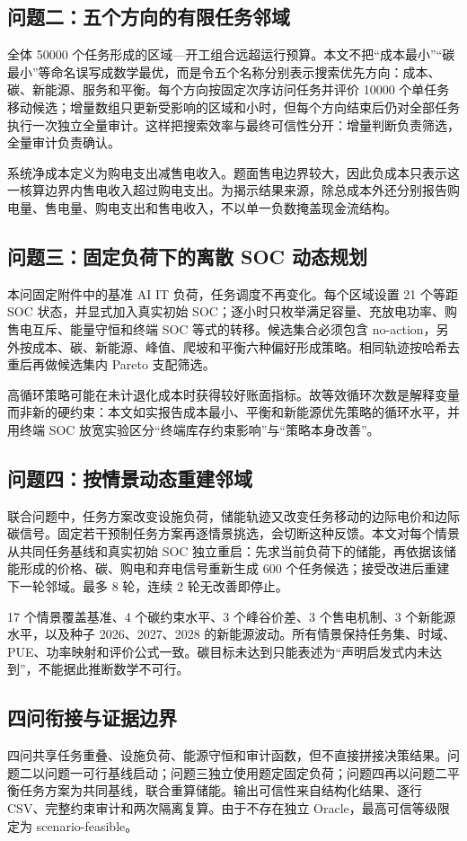 \documentclass[withoutpreface,bwprint]{cumcmthesis}
\begin{document}
\subsection{问题二：五个方向的有限任务邻域}
全体 50000 个任务形成的区域—开工组合远超运行预算。本文不把“成本最小”“碳最小”等命名误写成数学最优，而是令五个名称分别表示搜索优先方向：成本、碳、新能源、服务和平衡。每个方向按固定次序访问任务并评价 10000 个单任务移动候选；增量数组只更新受影响的区域和小时，但每个方向结束后仍对全部任务执行一次独立全量审计。这样把搜索效率与最终可信性分开：增量判断负责筛选，全量审计负责确认。

系统净成本定义为购电支出减售电收入。题面售电边界较大，因此负成本只表示这一核算边界内售电收入超过购电支出。为揭示结果来源，除总成本外还分别报告购电量、售电量、购电支出和售电收入，不以单一负数掩盖现金流结构。

\subsection{问题三：固定负荷下的离散 SOC 动态规划}
本问固定附件中的基准 AI IT 负荷，任务调度不再变化。每个区域设置 21 个等距 SOC 状态，并显式加入真实初始 SOC；逐小时只枚举满足容量、充放电功率、购售电互斥、能量守恒和终端 SOC 等式的转移。候选集合必须包含 no-action，另外按成本、碳、新能源、峰值、爬坡和平衡六种偏好形成策略。相同轨迹按哈希去重后再做候选集内 Pareto 支配筛选\cite{miettinen1999nonlinear}。

高循环策略可能在未计退化成本时获得较好账面指标。故等效循环次数是解释变量而非新的硬约束：本文如实报告成本最小、平衡和新能源优先策略的循环水平，并用终端 SOC 放宽实验区分“终端库存约束影响”与“策略本身改善”。

\subsection{问题四：按情景动态重建邻域}
联合问题中，任务方案改变设施负荷，储能轨迹又改变任务移动的边际电价和边际碳信号。固定若干预制任务方案再逐情景挑选，会切断这种反馈。本文对每个情景从共同任务基线和真实初始 SOC 独立重启：先求当前负荷下的储能，再依据该储能形成的价格、碳、购电和弃电信号重新生成 600 个任务候选；接受改进后重建下一轮邻域。最多 8 轮，连续 2 轮无改善即停止。

17 个情景覆盖基准、4 个碳约束水平、3 个峰谷价差、3 个售电机制、3 个新能源水平，以及种子 2026、2027、2028 的新能源波动。所有情景保持任务集、时域、PUE、功率映射和评价公式一致。碳目标未达到只能表述为“声明启发式内未达到”，不能据此推断数学不可行。

\subsection{四问衔接与证据边界}
四问共享任务重叠、设施负荷、能源守恒和审计函数，但不直接拼接决策结果。问题二以问题一可行基线启动；问题三独立使用题定固定负荷；问题四再以问题二平衡任务方案为共同基线，联合重算储能。输出可信性来自结构化结果、逐行 CSV、完整约束审计和两次隔离复算。由于不存在独立 Oracle，最高可信等级限定为 scenario-feasible。
\end{document}
